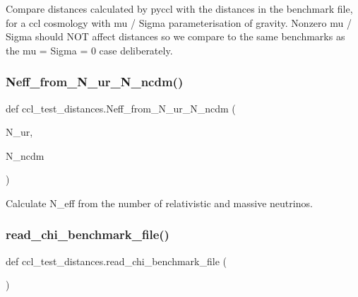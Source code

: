 \begin{DoxyVerb}Compare distances calculated by pyccl with the distances in the benchmark 
file, for a ccl cosmology with mu / Sigma parameterisation of gravity.
Nonzero mu / Sigma should NOT affect distances so we compare to the same
benchmarks as the mu = Sigma = 0 case deliberately.
\end{DoxyVerb}
 \mbox{\label{namespaceccl__test__distances_a0da11106f7f601d1ac8c71852fb35270}} 
\subsubsection{\texorpdfstring{Neff\+\_\+from\+\_\+\+N\+\_\+ur\+\_\+\+N\+\_\+ncdm()}{Neff\_from\_N\_ur\_N\_ncdm()}}
{\footnotesize\ttfamily def ccl\+\_\+test\+\_\+distances.\+Neff\+\_\+from\+\_\+\+N\+\_\+ur\+\_\+\+N\+\_\+ncdm (\begin{DoxyParamCaption}\item[{}]{N\+\_\+ur,  }\item[{}]{N\+\_\+ncdm }\end{DoxyParamCaption})}

\begin{DoxyVerb}Calculate N_eff from the number of relativistic and massive neutrinos.\end{DoxyVerb}
 \mbox{\label{namespaceccl__test__distances_a7dd4773871d3361cfe222308017fa3fb}} 
\subsubsection{\texorpdfstring{read\+\_\+chi\+\_\+benchmark\+\_\+file()}{read\_chi\_benchmark\_file()}}
{\footnotesize\ttfamily def ccl\+\_\+test\+\_\+distances.\+read\+\_\+chi\+\_\+benchmark\+\_\+file (\begin{DoxyParamCaption}{ }\end{DoxyParamCaption})}


